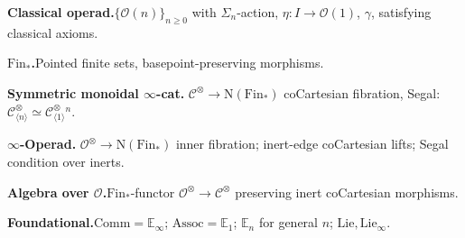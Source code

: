 \begin{formalrestatement}
\textbf{Classical operad.}\quad $\{\mathcal{O}(n)\}_{n \geq 0}$ with
$\Sigma_n$-action, $\eta : I \to \mathcal{O}(1)$, $\gamma$, satisfying
classical axioms.

\medskip
\textbf{$\mathrm{Fin}_*$.}\quad Pointed finite sets, basepoint-preserving morphisms.

\medskip
\textbf{Symmetric monoidal $\infty$-cat.}\quad
$\mathcal{C}^\otimes \to \mathrm{N}(\mathrm{Fin}_*)$ coCartesian fibration,
Segal: $\mathcal{C}^\otimes_{\langle n \rangle} \simeq \mathcal{C}^\otimes_{\langle 1 \rangle}{}^n$.

\medskip
\textbf{$\infty$-Operad.}\quad
$\mathcal{O}^\otimes \to \mathrm{N}(\mathrm{Fin}_*)$ inner fibration;
inert-edge coCartesian lifts; Segal condition over inerts.

\medskip
\textbf{Algebra over $\mathcal{O}$.}\quad $\mathrm{Fin}_*$-functor
$\mathcal{O}^\otimes \to \mathcal{C}^\otimes$ preserving inert
coCartesian morphisms.

\medskip
\textbf{Foundational.}\quad $\mathrm{Comm} = \mathbb{E}_\infty$;
$\mathrm{Assoc} = \mathbb{E}_1$; $\mathbb{E}_n$ for general $n$;
$\mathrm{Lie}, \mathrm{Lie}_\infty$.
\end{formalrestatement}
